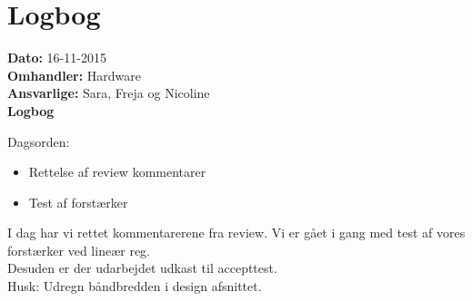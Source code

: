 \section{Logbog}

\textbf{Dato:} 16-11-2015 \\
\textbf{Omhandler:} Hardware \\
\textbf{Ansvarlige:} Sara, Freja og Nicoline \\
\textbf{Logbog}

Dagsorden:
\begin{itemize}
	\item Rettelse af review kommentarer
	\item Test af forstærker
\end{itemize}
I dag har vi rettet kommentarerene fra review. Vi er gået i gang med test af vores forstærker ved lineær reg.\\
Desuden er der udarbejdet udkast til accepttest.\\
Husk: Udregn båndbredden i design afsnittet.\\

   
